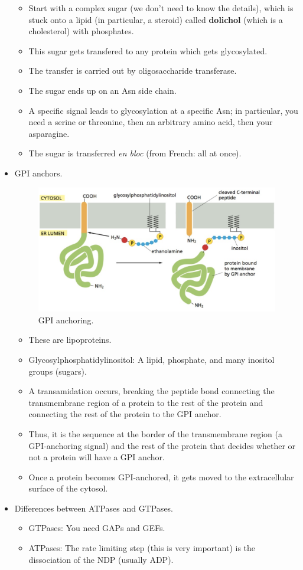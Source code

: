 \documentclass[../notes.tex]{subfiles}
\begin{document}
\begin{itemize}
\begin{itemize}
        \item Start with a complex sugar (we don't need to know the details), which is stuck onto a lipid (in particular, a steroid) called \textbf{dolichol} (which is a cholesterol) with phosphates.
        \item This sugar gets transfered to any protein which gets glycosylated.
        \item The transfer is carried out by oligosaccharide transferase.
        \item The sugar ends up on an Asn side chain.
        \item A specific signal leads to glycosylation at a specific Asn; in particular, you need a serine or threonine, then an arbitrary amino acid, then your asparagine.
        \item The sugar is transferred \emph{en bloc} (from French: all at once).
    \end{itemize}
    \item GPI anchors.
    \begin{figure}[h!]
        \centering
        \includegraphics[width=0.5\linewidth]{../ExtFiles/GPIanchor.png}
        \caption{GPI anchoring.}
        \label{fig:GPIanchor}
    \end{figure}
    \begin{itemize}
        \item These are lipoproteins.
        \item Glycosylphosphatidylinositol: A lipid, phosphate, and many inositol groups (sugars).
        \item A transamidation occurs, breaking the peptide bond connecting the transmembrane region of a protein to the rest of the protein and connecting the rest of the protein to the GPI anchor.
        \item Thus, it is the sequence at the border of the transmembrane region (a GPI-anchoring signal) and the rest of the protein that decides whether or not a protein will have a GPI anchor.
        \item Once a protein becomes GPI-anchored, it gets moved to the extracellular surface of the cytosol.
    \end{itemize}
    \item Differences between ATPases and GTPases.
    \begin{itemize}
        \item GTPases: You need GAPs and GEFs.
        \item ATPases: The rate limiting step (this is very important) is the dissociation of the NDP (usually ADP).
    \end{itemize}
\end{itemize}
\end{document}

